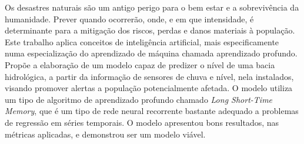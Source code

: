 
\setlength{\absparsep}{18pt} 
\begin{resumo}

\noindent 
\hspace{1.5cm} Os desastres naturais são um antigo perigo para o bem estar e a sobrevivência da humanidade. Prever quando ocorrerão, onde, e em que intensidade, é determinante para a mitigação dos riscos, perdas e danos materiais à população. Este trabalho aplica conceitos de inteligência artificial, mais especificamente numa especialização do aprendizado de máquina chamada aprendizado profundo. Propõe a elaboração de um modelo capaz de predizer o nível de uma bacia hidrológica, a partir da informação de sensores de chuva e nível, nela instalados, visando promover alertas a população potencialmente afetada. O modelo utiliza um tipo de algoritmo de aprendizado profundo chamado \textit{Long Short-Time Memory}, que é um tipo de rede neural recorrente bastante adequado a problemas de regressão em séries temporais. O modelo apresentou bons resultados, nas métricas aplicadas, e demonstrou ser um modelo viável.

\vspace{1cm}


\end{resumo}
